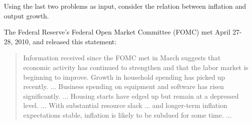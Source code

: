 \documentclass[12pt]{exam}
\begin{document}
\begin{questions}
\begin{solution}
\end{solution}


Using the last two problems as input, consider the relation
between inflation and output growth.

\begin{solution}
\end{solution}

The Federal Reserve's Federal Open Market Committee (FOMC)
met April 27-28, 2010, and released this statement:
%
\begin{quote}
Information received since the FOMC met in March suggests that economic activity has continued to strengthen and that the labor market is beginning to improve. Growth in household spending has picked up recently.  ...
Business spending on equipment and software has risen significantly. ...
Housing starts have edged up but remain at a depressed level. ...
With substantial resource slack ... and longer-term inflation expectations stable, inflation is likely to be subdued for some time. ...


\end{quote}
\end{questions}
\end{document}
